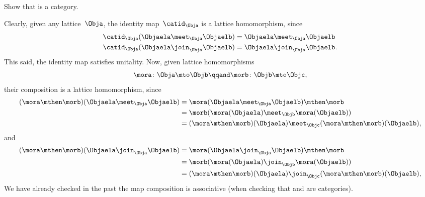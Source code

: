 \begin{exercise}
    \label{ex:lat_is_cat}
    Show that \Lat is a category.
\end{exercise}
\begin{solution}
    Clearly, given any lattice~$\Obja$, the identity map~$\catid_\Obja$ is a lattice homomorphism, since
    \begin{equation}
        \begin{aligned}
            \catid_\Obja(\Objaela \meet_\Obja \Objaelb) & =\Objaela \meet_\Obja \Objaelb \\
            \catid_\Obja(\Objaela \join_\Obja \Objaelb) & =\Objaela \join_\Obja \Objaelb.
        \end{aligned}
    \end{equation}
    This said, the identity map satisfies unitality.
    Now, given lattice homomorphisms
    \begin{equation}
        \mora\colon \Obja \mto \Objb
        \qqand
        \morb\colon \Objb\mto \Objc,
    \end{equation}
    their composition is a lattice homomorphism, since
    \begin{equation}
        \begin{aligned}
            (\mora \mthen \morb)(\Objaela \meet_\Obja \Objaelb)
             & = \mora(\Objaela \meet_\Obja \Objaelb) \mthen \morb \\
             & = \morb(\mora(\Objaela) \meet_\Objb \mora(\Objaelb)) \\
             & =(\mora \mthen \morb)(\Objaela) \meet_\Objc (\mora \mthen \morb)(\Objaelb),
        \end{aligned}
    \end{equation}
    and
    \begin{equation}
        \begin{aligned}
            (\mora \mthen \morb)(\Objaela \join_\Obja \Objaelb)
             & = \mora(\Objaela \join_\Obja \Objaelb) \mthen \morb \\
             & = \morb(\mora(\Objaela) \join_\Objb \mora(\Objaelb)) \\
             & =(\mora \mthen \morb)(\Objaela) \join_\Objc (\mora \mthen \morb)(\Objaelb),
        \end{aligned}
    \end{equation}
    We have already checked in the past the map composition is associative (\eg when checking that \Set and \Pos are categories).
\end{solution}

